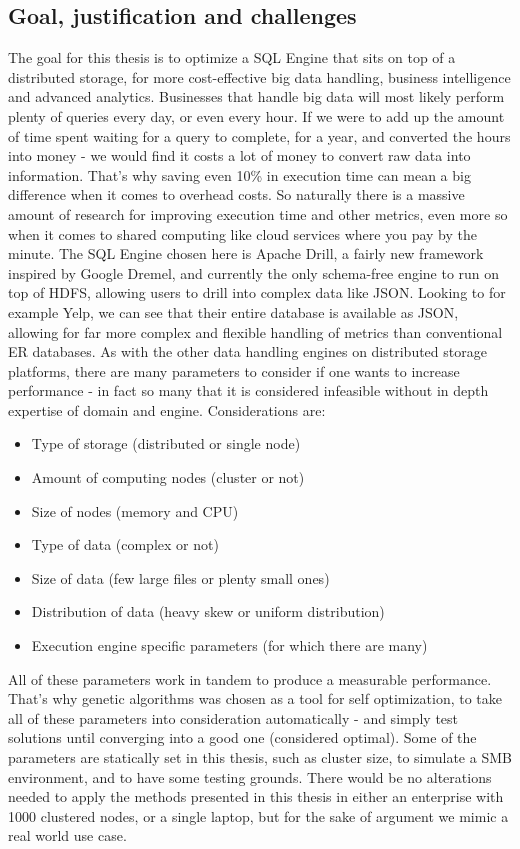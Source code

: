 \documentclass[a4paper,english]{report}
\begin{document}
		\subsection{Goal, justification and challenges}
		The goal for this thesis is to optimize a SQL Engine that sits on top of a distributed storage, for more cost-effective big data handling, business intelligence and advanced analytics. Businesses that handle big data will most likely perform plenty of queries every day, or even every hour. If we were to add up the amount of time spent waiting for a query to complete, for a year, and converted the hours into money - we would find it costs a lot of money to convert raw data into information. That's why saving even 10\% in execution time can mean a big difference when it comes to overhead costs. So naturally there is a massive amount of research for improving execution time and other metrics, even more so when it comes to shared computing like cloud services where you pay by the minute. The SQL Engine chosen here is Apache Drill, a fairly new framework inspired by Google Dremel, and currently the only schema-free engine to run on top of HDFS, allowing users to drill into complex data like JSON. Looking to for example Yelp, we can see that their entire database is available as JSON\cite{yelp}, allowing for far more complex  and flexible handling of metrics than conventional ER databases. As with the other data handling engines on distributed storage platforms, there are many parameters to consider if one wants to increase performance - in fact so many that it is considered infeasible without in depth expertise of domain and engine. Considerations are:
		\begin{itemize}
			\item Type of storage (distributed or single node)
			\item Amount of computing nodes (cluster or not)
			\item Size of nodes (memory and CPU)
			\item Type of data (complex or not)
			\item Size of data (few large files or plenty small ones)
			\item Distribution of data (heavy skew or uniform distribution)
			\item Execution engine specific parameters (for which there are many)
		\end{itemize}
		All of these parameters work in tandem to produce a measurable performance. That's why genetic algorithms was chosen as a tool for self optimization, to take all of these parameters into consideration automatically - and simply test solutions until converging into a good one (considered optimal). Some of the parameters are statically set in this thesis, such as cluster size, to simulate a SMB environment, and to have some testing grounds. There would be no alterations needed to apply the methods presented in this thesis in either an enterprise with 1000 clustered nodes, or a single laptop, but for the sake of argument we mimic a real world use case.
\end{document}
